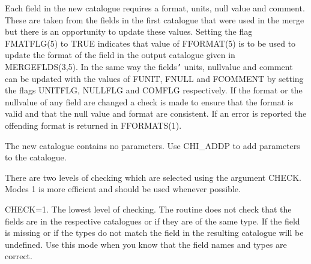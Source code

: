 \documentclass[11pt,nolof]{starlink}
\begin{document}
\begin{small}
{{      Each field in the new catalogue requires a format, units, null value and
      comment. These are taken from the fields in the first catalogue that were
      used in the merge but there is an opportunity to update these values.
      Setting the flag  FMATFLG(5) to TRUE indicates that value of FFORMAT(5)
      is to  be used to update the format of the field in the output catalogue
      given in MERGEFLDS(3,5). In the same way the fields\texttt{'} units, nullvalue and
      comment can be updated with the values of FUNIT, FNULL and
      FCOMMENT by setting the flags UNITFLG, NULLFLG and COMFLG
      respectively. If the format or the nullvalue of any field are changed
      a check is made to ensure that the format is valid and that the null
      value and format are consistent. If an error is reported the offending
      format is returned in FFORMATS(1).

      The new catalogue contains no parameters. Use CHI\_ADDP
      to add parameters to the catalogue.

      There are two levels of checking which are selected using the argument
      CHECK. Modes 1 is more efficient and should be used whenever possible.

      CHECK=1. The lowest level of checking. The routine does not check that
      the fields are in the respective catalogues or if they are of the same
      type. If the field is missing or if the types do not match the field
      in the resulting catalogue will be undefined. Use this mode when you
      know that the field names and types are correct.

}}
\end{small}
\end{document}
